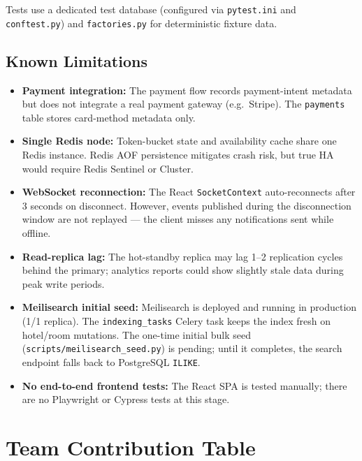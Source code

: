 \documentclass[12pt,a4paper]{article}
\begin{document}
Tests use a dedicated test database (configured via \texttt{pytest.ini} and \texttt{conftest.py}) and \texttt{factories.py} for deterministic fixture data.

\subsection{Known Limitations}

\begin{itemize}[noitemsep]
  \item \textbf{Payment integration:} The payment flow records payment-intent metadata but does not integrate a real payment gateway (e.g.\ Stripe). The \texttt{payments} table stores card-method metadata only.
  \item \textbf{Single Redis node:} Token-bucket state and availability cache share one Redis instance. Redis AOF persistence mitigates crash risk, but true HA would require Redis Sentinel or Cluster.
  \item \textbf{WebSocket reconnection:} The React \texttt{SocketContext} auto-reconnects after 3 seconds on disconnect. However, events published during the disconnection window are not replayed --- the client misses any notifications sent while offline.
  \item \textbf{Read-replica lag:} The hot-standby replica may lag 1--2 replication cycles behind the primary; analytics reports could show slightly stale data during peak write periods.
  \item \textbf{Meilisearch initial seed:} Meilisearch is deployed and running in production (1/1 replica). The \texttt{indexing\_tasks} Celery task keeps the index fresh on hotel/room mutations. The one-time initial bulk seed (\texttt{scripts/meilisearch\_seed.py}) is pending; until it completes, the search endpoint falls back to PostgreSQL \texttt{ILIKE}.
  \item \textbf{No end-to-end frontend tests:} The React SPA is tested manually; there are no Playwright or Cypress tests at this stage.
\end{itemize}

\section{Team Contribution Table}
\end{document}
